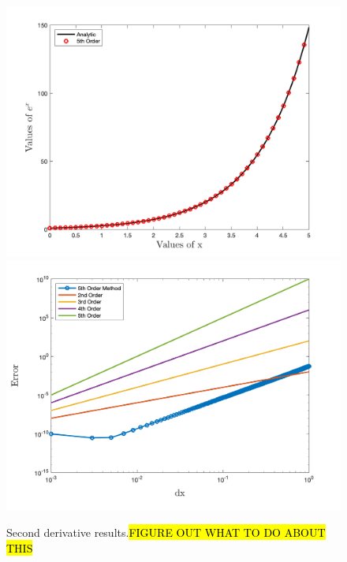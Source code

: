 \begin{figure}
	\begin{multicols}{2}
		\includegraphics[width=1.1\columnwidth]{figs/2ndDer.png}
		\label{fig:2ndDer} 
		\includegraphics[width=1.1\columnwidth]{figs/2ndErr.png}
		\label{fig:2ndErr} 
	\end{multicols}	
		\caption{Second derivative results.\hl{FIGURE OUT WHAT TO DO ABOUT THIS}}
\end{figure}


